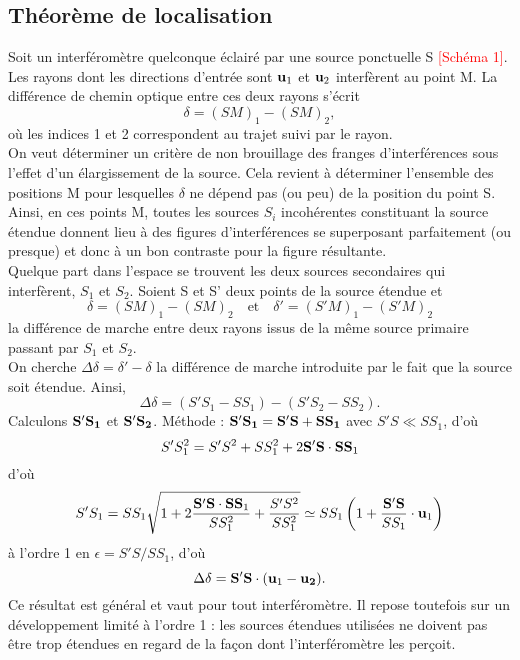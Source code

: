 \documentclass[11pt,a4paper]{report}
\begin{document}
\subsection{Théorème de localisation}

Soit un interféromètre quelconque éclairé par une source ponctuelle S \textcolor{red}{[Schéma 1]}. Les rayons dont les directions d'entrée sont $\bold{u}_1$ et $\bold{u}_2$ interfèrent au point M. La différence de chemin optique entre ces deux rayons s'écrit
\begin{equation}
	\boxed{\delta = (SM)_1 - (SM)_2},
\end{equation}
où les indices 1 et 2 correspondent au trajet suivi par le rayon.\\

On veut déterminer un critère de non brouillage des franges d'interférences sous l'effet d'un élargissement de la source. Cela revient à déterminer l'ensemble des positions M pour lesquelles $\delta$ ne dépend pas (ou peu) de la position du point S. Ainsi, en ces points M, toutes les sources $S_i$ incohérentes constituant la source étendue donnent lieu à des figures d'interférences se superposant parfaitement (ou presque) et donc à un bon contraste pour la figure résultante.\\

Quelque part dans l'espace se trouvent les deux sources secondaires qui interfèrent, $S_1$ et $S_2$. Soient S et S' deux points de la source étendue et
\begin{equation}
	\delta = (SM)_1 - (SM)_2 \quad\text{et}\quad \delta' = (S'M)_1 - (S'M)_2
\end{equation}
la différence de marche entre deux rayons issus de la même source primaire passant par $S_1$ et $S_2$.\\

On cherche $\Delta\delta = \delta' - \delta$ la différence de marche introduite par le fait que la source soit étendue. Ainsi,
\begin{equation}
	\Delta \delta = (S'S_1 - SS_1) - (S'S_2 - SS_2).
\end{equation}
Calculons $\bold{S'S_1}$ et $\bold{S'S_2}$. Méthode : $\bold{S'S_1} = \bold{S'S} + \bold{SS_1}$ avec $S'S \ll SS_1$, d'où
\begin{equation}
	S'S_1^2 = S'S^2 + SS_1^2 + 2\bold{S'S}\cdot\bold{SS}_1
\end{equation}
d'où
\begin{equation}
	S'S_1 = SS_1 \sqrt{1 + 2\frac{\bold{S'S}\cdot\bold{SS}_1}{SS_1^2} + \frac{S'S^2}{SS_1^2}}
	\simeq SS_1\left(1 + \frac{\bold{S'S}}{SS_1}\cdot\bold{u}_1\right)
\end{equation}
à l'ordre 1 en $\epsilon = S'S/SS_1$,
d'où
\begin{equation}
	\Delta\delta = \bold{S'S}\cdot(\bold{u}_1 - \bold{u_2}).
\end{equation}
Ce résultat est général et vaut pour tout interféromètre. Il repose toutefois sur un développement limité à l'ordre 1 : les sources étendues utilisées ne doivent pas être trop étendues en regard de la façon dont l'interféromètre les perçoit.\\
\end{document}
